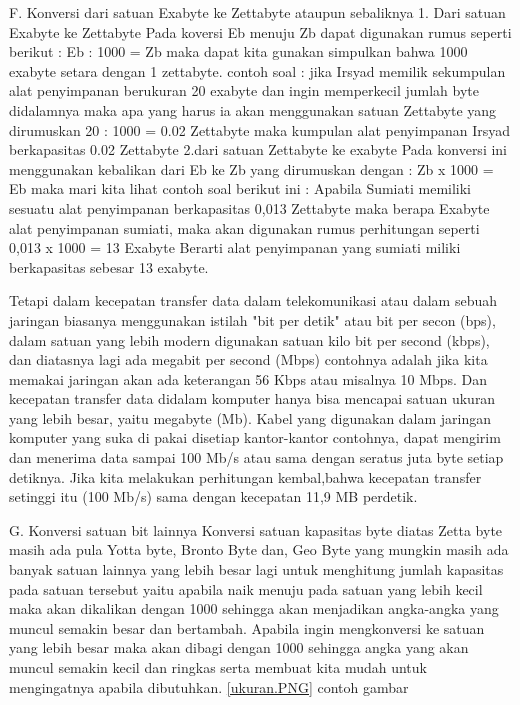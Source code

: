 F. Konversi dari satuan Exabyte ke Zettabyte ataupun sebaliknya
1. Dari satuan Exabyte ke Zettabyte
Pada koversi Eb menuju Zb dapat digunakan rumus seperti berikut :
Eb : 1000 = Zb
maka dapat kita gunakan simpulkan bahwa 1000 exabyte setara dengan 1 zettabyte.
contoh soal :
jika Irsyad memilik sekumpulan alat penyimpanan berukuran 20 exabyte dan ingin memperkecil jumlah byte didalamnya maka apa yang harus ia akan menggunakan satuan Zettabyte yang dirumuskan
20 : 1000 = 0.02 Zettabyte
maka kumpulan alat penyimpanan Irsyad berkapasitas 0.02 Zettabyte
2.dari satuan Zettabyte ke exabyte
Pada konversi ini menggunakan kebalikan dari Eb ke Zb yang dirumuskan dengan :
Zb x 1000 = Eb
maka mari kita lihat contoh soal berikut ini :
Apabila Sumiati memiliki sesuatu alat penyimpanan berkapasitas 0,013 Zettabyte maka berapa Exabyte alat penyimpanan sumiati, maka akan digunakan rumus perhitungan seperti
0,013 x 1000 = 13 Exabyte
Berarti alat penyimpanan yang sumiati miliki berkapasitas sebesar 13 exabyte.

Tetapi dalam kecepatan transfer data dalam telekomunikasi atau dalam sebuah jaringan biasanya menggunakan istilah "bit per detik" atau
bit per secon (bps), dalam satuan yang lebih modern digunakan satuan kilo bit per second (kbps), dan diatasnya lagi ada megabit per second (Mbps)
contohnya adalah jika kita memakai jaringan akan ada keterangan 56 Kbps atau misalnya 10 Mbps. Dan kecepatan transfer data didalam komputer hanya bisa mencapai satuan ukuran yang lebih besar, yaitu megabyte (Mb). Kabel yang digunakan dalam jaringan komputer yang suka di pakai disetiap kantor-kantor  contohnya, dapat mengirim dan menerima data sampai 100 Mb/s atau sama dengan seratus juta byte setiap detiknya. Jika kita melakukan perhitungan kembal,bahwa kecepatan transfer setinggi itu (100 Mb/s) sama dengan kecepatan 11,9 MB perdetik.

G. Konversi satuan bit lainnya
Konversi satuan kapasitas byte diatas Zetta byte masih ada pula Yotta byte, Bronto Byte dan, Geo Byte yang mungkin masih ada banyak satuan lainnya yang lebih besar lagi untuk menghitung jumlah kapasitas pada satuan tersebut yaitu apabila naik menuju pada satuan yang lebih kecil maka akan dikalikan dengan 1000 sehingga akan menjadikan angka-angka yang muncul semakin besar dan bertambah. 
Apabila ingin mengkonversi ke satuan yang lebih besar maka akan dibagi dengan 1000 sehingga angka yang akan muncul semakin kecil dan ringkas serta membuat kita mudah untuk mengingatnya apabila dibutuhkan.
\ref{ukuran.PNG}
contoh gambar

